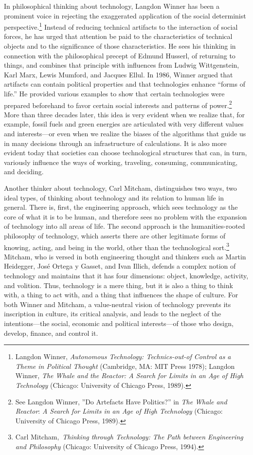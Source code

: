 \documentclass{tufte-handout}
\begin{document}
In philosophical thinking about technology, Langdon Winner has been a
prominent voice in rejecting the exaggerated application of the social
determinist perspective.\footnote{Langdon Winner, \emph{Autonomous Technology: Technics-out-of Control
  as a Theme in Political Thought} (Cambridge, MA: MIT Press 1978);
  Langdon Winner, \emph{The Whale and the Reactor: A Search for Limits
  in an Age of High Technology} (Chicago: University of Chicago Press,
  1989).
} Instead
of reducing technical artifacts to the interaction of social forces, he
has urged that attention be paid to the characteristics of technical
objects and to the significance of those characteristics. He sees his
thinking in connection with the philosophical precept of Edmund Husserl,
of returning to things, and combines that principle with influences from
Ludwig Wittgenstein, Karl Marx, Lewis Mumford, and Jacques Ellul. In
1986, Winner argued that artifacts can contain political properties and
that technologies enhance ``forms of life.'' He provided various
examples to show that certain technologies were prepared beforehand to
favor certain social interests and patterns of
power.\footnote{See Langdon Winner, ''Do Artefacts Have Politics?'' in \emph{The Whale
  and Reactor}: \emph{A Search for Limits in an Age of High Technology}
  (Chicago: University of Chicago Press, 1989).
} More than three decades
later, this idea is very evident when we realize that, for example,
fossil fuels and green energies are articulated with very different
values and interests---or even when we realize the biases of the
algorithms that guide us in many decisions through an infrastructure of
calculations. It is also more evident today that societies can choose
technological structures that can, in turn, variously influence the ways
of working, traveling, consuming, communicating, and deciding.

Another thinker about technology, Carl Mitcham, distinguishes two ways,
two ideal types, of thinking about technology and its relation to human
life in general. There is, first, the engineering approach, which sees
technology as the core of what it is to be human, and therefore sees no
problem with the expansion of technology into all areas of life. The
second approach is the humanities-rooted philosophy of technology, which
asserts there are other legitimate forms of knowing, acting, and being
in the world, other than the technological
sort.\footnote{Carl Mitcham,~\emph{Thinking through Technology: The Path between
  Engineering and Philosophy} (Chicago: University of Chicago Press,
  1994).
} Mitcham, who is versed in
both engineering thought and thinkers such as Martin Heidegger, José
Ortega y Gasset, and Ivan Illich, defends a complex notion of technology
and maintains that it has four dimensions: object, knowledge, activity,
and volition. Thus, technology is a mere thing, but it is also a thing
to think with, a thing to act with, and a thing that influences the
shape of culture. For both Winner and Mitcham, a value-neutral vision of
technology prevents its inscription in culture, its critical analysis,
and leads to the neglect of the intentions---the social, economic and
political interests---of those who design, develop, finance, and control
it.
\end{document}
